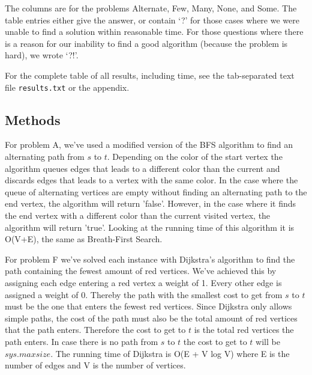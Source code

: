 \documentclass[a4paper]{article}
\begin{document}
The columns are for the problems Alternate, Few, Many, None, and Some.
The table entries either give the answer, or contain `?' for those cases where we were unable to find a solution within reasonable time.
For those questions where there is a reason for our inability to find a good algorithm (because the problem is hard), we wrote `?!'.

For the complete table of all results, including time, see the tab-separated text file {\tt results.txt} or the appendix.

\subsection{Methods}
For problem A, we've used a modified version of the BFS algorithm to find an alternating path from $s$ to $t$. Depending on the color of the start vertex the algorithm queues edges that leads to a different color than the current and discards edges that leads to a vertex with the same color. In the case where the queue of alternating vertices are empty without finding an alternating path to the end vertex, the algorithm will return 'false'. However, in the case where it finds the end vertex with a different color than the current visited vertex, the algorithm will return 'true'.
Looking at the running time of this algorithm it is O(V+E), the same as Breath-First Search.

For problem F we've solved each instance with Dijkstra's algorithm to find the path containing the fewest amount of red vertices. We've achieved this by assigning each edge entering a red vertex a weight of 1. Every other edge is assigned a weight of 0. Thereby the path with the smallest cost to get from $s$ to $t$ must be the one that enters the fewest red vertices. Since Dijkstra only allows simple paths, the cost of the path must also be the total amount of red vertices that the path enters. Therefore the cost to get to $t$ is the total red vertices the path enters. In case there is no path from $s$ to $t$ the cost to get to $t$ will be $sys.maxsize$. The running time of Dijkstra is O(E + V log V) where E is the number of edges and V is the number of vertices.
\end{document}

